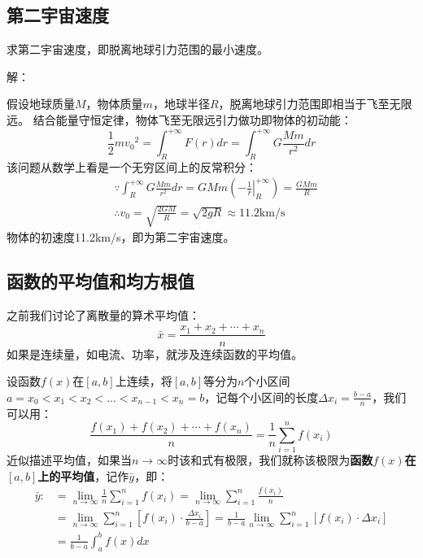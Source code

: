 \subsection{第二宇宙速度}

\begin{example}
求第二宇宙速度，即脱离地球引力范围的最小速度。
\end{example}

解：

假设地球质量$M$，物体质量$m$，地球半径$R$，脱离地球引力范围即相当于飞至无限远。
结合能量守恒定律，物体飞至无限远引力做功即物体的初动能：
\[
\frac{1}{2}{mv_0}^2=\int_R^{+\infty}{F\left( r \right) dr}=\int_R^{+\infty}{G\frac{Mm}{r^2}dr}
\]
该问题从数学上看是一个无穷区间上的反常积分：
\begin{align*}
&\because \int_R^{+\infty}{G\frac{Mm}{r^2}dr}=GMm\left( \left. -\frac{1}{r} \right|_{R}^{+\infty} \right) =\frac{GMm}{R} \\
&\therefore v_0=\sqrt{\frac{2GM}{R}}=\sqrt{2gR}\approx 11.2\mathrm{km}/\mathrm{s}
\end{align*}
物体的初速度11.2km/s，即为第二宇宙速度。

\subsection{函数的平均值和均方根值}

之前我们讨论了离散量的算术平均值：
\[
\bar{x}=\frac{x_1+x_2+\cdots +x_n}{n}
\]
如果是连续量，如电流、功率，就涉及连续函数的平均值。

\begin{definition}[函数的平均值]
设函数$f\left( x \right) $在$\left[ a,b \right] $上连续，将$\left[ a,b \right] $等分为$n$个小区间$a=x_0<x_1<x_2<...<x_{n-1}<x_n=b$，记每个小区间的长度$\Delta x_i=\frac{b-a}{n}$，我们可以用：
\[
\frac{f\left( x_1 \right) +f\left( x_2 \right) +\cdots +f\left( x_n \right)}{n}=\frac{1}{n}\sum_{i=1}^n{f\left( x_i \right)}
\]
近似描述平均值，如果当$n\rightarrow \infty $时该和式有极限，我们就称该极限为{\bf 函数$f\left( x \right) $在$\left[ a,b \right] $上的平均值}，记作$\bar{y}$，即：
\begin{align*}
\bar{y}:&=\underset{n\rightarrow \infty}{\lim}\frac{1}{n}\sum_{i=1}^n{f\left( x_i \right)}=\underset{n\rightarrow \infty}{\lim}\sum_{i=1}^n{\frac{f\left( x_i \right)}{n}} \\
&=\underset{n\rightarrow \infty}{\lim}\sum_{i=1}^n{\left[ f\left( x_i \right) \cdot \frac{\Delta x_i}{b-a} \right]}=\frac{1}{b-a}\underset{n\rightarrow \infty}{\lim}\sum_{i=1}^n{\left[ f\left( x_i \right) \cdot \Delta x_i \right]} \\
&=\frac{1}{b-a}\int_a^b{f\left( x \right) dx}
\end{align*}
\end{definition}

